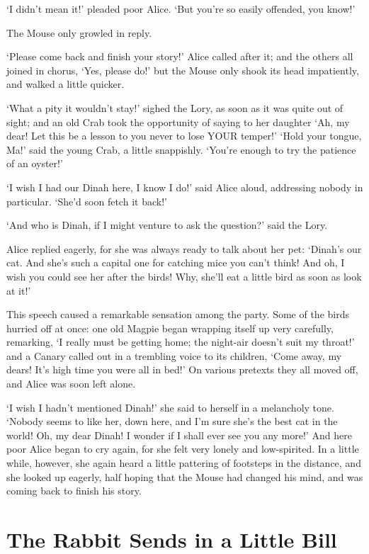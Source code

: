 \documentclass[12pt]{book}
\begin{document}
\begin{Parallel}[p]{}{}
{‘I didn’t mean it!’ pleaded poor Alice. ‘But you’re so easily offended, you know!’

The Mouse only growled in reply.

‘Please come back and finish your story!’ Alice called after it; and the others all joined in chorus, ‘Yes, please do!’ but the Mouse only shook its head impatiently, and walked a little quicker.

‘What a pity it wouldn’t stay!’ sighed the Lory, as soon as it was quite out of sight; and an old Crab took the opportunity of saying to her daughter ‘Ah, my dear! Let this be a lesson to you never to lose YOUR temper!’ ‘Hold your tongue, Ma!’ said the young Crab, a little snappishly. ‘You’re enough to try the patience of an oyster!’

‘I wish I had our Dinah here, I know I do!’ said Alice aloud, addressing nobody in particular. ‘She’d soon fetch it back!’

‘And who is Dinah, if I might venture to ask the question?’ said the Lory.

Alice replied eagerly, for she was always ready to talk about her pet: ‘Dinah’s our cat. And she’s such a capital one for catching mice you can’t think! And oh, I wish you could see her after the birds! Why, she’ll eat a little bird as soon as look at it!’

This speech caused a remarkable sensation among the party. Some of the birds hurried off at once: one old Magpie began wrapping itself up very carefully, remarking, ‘I really must be getting home; the night-air doesn’t suit my throat!’ and a Canary called out in a trembling voice to its children, ‘Come away, my dears! It’s high time you were all in bed!’ On various pretexts they all moved off, and Alice was soon left alone.

‘I wish I hadn’t mentioned Dinah!’ she said to herself in a melancholy tone. ‘Nobody seems to like her, down here, and I’m sure she’s the best cat in the world! Oh, my dear Dinah! I wonder if I shall ever see you any more!’ And here poor Alice began to cry again, for she felt very lonely and low-spirited. In a little while, however, she again heard a little pattering of footsteps in the distance, and she looked up eagerly, half hoping that the Mouse had changed his mind, and was coming back to finish his story.




\section{The Rabbit Sends in a Little Bill}

}
\end{Parallel}
\end{document}
